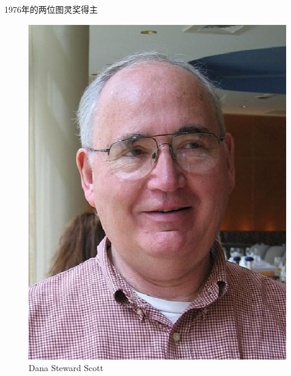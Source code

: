 \documentclass{beamer}
\begin{document}
\begin{frame}{1976年的两位图灵奖得主}
\begin{figure}[htbp]
\begin{minipage}{0.4\textwidth}
			\centering\includegraphics[scale=0.3]{figures/sct.eps}
			\caption*{Dana Steward Scott}
		\end{minipage}
	\end{figure}
\end{frame}
\end{document}
